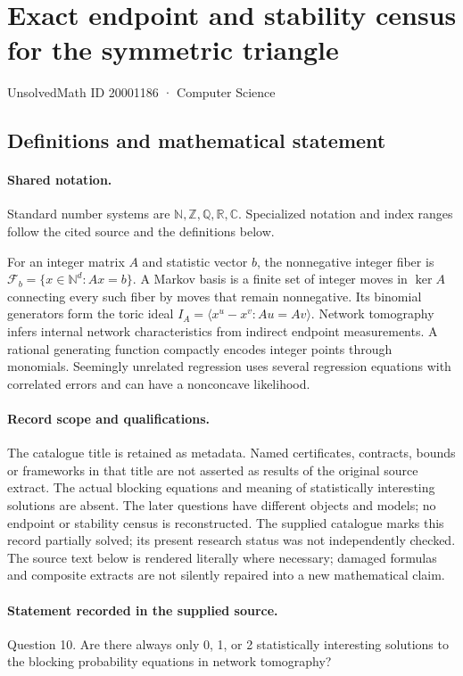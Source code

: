 \documentclass[11pt]{article}
\begin{document}
\setcounter{section}{20001185}
\section{Exact endpoint and stability census for the symmetric triangle}\label{20001186}
{\small\sffamily UnsolvedMath ID 20001186 · Computer Science}
\subsection{Definitions and mathematical statement}

\paragraph{Shared notation.}Standard number systems are $\mathbb N,\mathbb Z,\mathbb Q,\mathbb R,\mathbb C$. Specialized notation and index ranges follow the cited source and the definitions below.


For an integer matrix $A$ and statistic vector $b$, the nonnegative integer fiber is $\mathcal F_b=\{x\in\mathbb N^d:Ax=b\}$. A Markov basis is a finite set of integer moves in $\ker A$ connecting every such fiber by moves that remain nonnegative. Its binomial generators form the toric ideal $I_A=\langle x^u-x^v:Au=Av\rangle$. Network tomography infers internal network characteristics from indirect endpoint measurements. A rational generating function compactly encodes integer points through monomials. Seemingly unrelated regression uses several regression equations with correlated errors and can have a nonconcave likelihood.
\paragraph{Record scope and qualifications.}
The catalogue title is retained as metadata. Named certificates, contracts, bounds or frameworks in that title are not asserted as results of the original source extract.
The actual blocking equations and meaning of statistically interesting solutions are absent. The later questions have different objects and models; no endpoint or stability census is reconstructed. The supplied catalogue marks this record partially solved; its present research status was not independently checked.
The source text below is rendered literally where necessary; damaged formulas and composite extracts are not silently repaired into a new mathematical claim.
\paragraph{Statement recorded in the supplied source.}
Question 10. Are there always only 0, 1, or 2 statistically interesting solutions to the blocking probability equations in network tomography?
\end{document}

